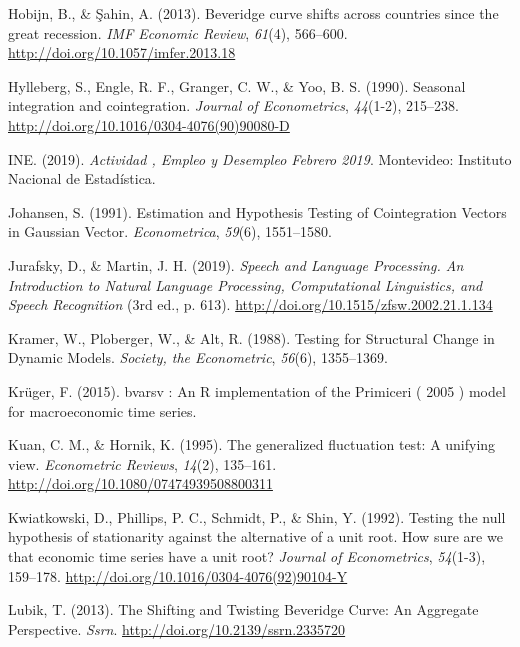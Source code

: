 \documentclass[12pt,oneside]{reedthesis}
\begin{document}
\leavevmode\hypertarget{ref-Hobijn2013}{}%
Hobijn, B., \& Şahin, A. (2013). Beveridge curve shifts across countries since the great recession. \emph{IMF Economic Review}, \emph{61}(4), 566--600. \url{http://doi.org/10.1057/imfer.2013.18}

\leavevmode\hypertarget{ref-hegy1990}{}%
Hylleberg, S., Engle, R. F., Granger, C. W., \& Yoo, B. S. (1990). Seasonal integration and cointegration. \emph{Journal of Econometrics}, \emph{44}(1-2), 215--238. \url{http://doi.org/10.1016/0304-4076(90)90080-D}

\leavevmode\hypertarget{ref-INE2019}{}%
INE. (2019). \emph{Actividad , Empleo y Desempleo Febrero 2019}. Montevideo: Instituto Nacional de Estadística.

\leavevmode\hypertarget{ref-Johansen1991}{}%
Johansen, S. (1991). Estimation and Hypothesis Testing of Cointegration Vectors in Gaussian Vector. \emph{Econometrica}, \emph{59}(6), 1551--1580.

\leavevmode\hypertarget{ref-Jurasky2019}{}%
Jurafsky, D., \& Martin, J. H. (2019). \emph{Speech and Language Processing. An Introduction to Natural Language Processing, Computational Linguistics, and Speech Recognition} (3rd ed., p. 613). \url{http://doi.org/10.1515/zfsw.2002.21.1.134}

\leavevmode\hypertarget{ref-Society1988}{}%
Kramer, W., Ploberger, W., \& Alt, R. (1988). Testing for Structural Change in Dynamic Models. \emph{Society, the Econometric}, \emph{56}(6), 1355--1369.

\leavevmode\hypertarget{ref-Kruger2015}{}%
Krüger, F. (2015). bvarsv : An R implementation of the Primiceri ( 2005 ) model for macroeconomic time series.

\leavevmode\hypertarget{ref-Kuan1995}{}%
Kuan, C. M., \& Hornik, K. (1995). The generalized fluctuation test: A unifying view. \emph{Econometric Reviews}, \emph{14}(2), 135--161. \url{http://doi.org/10.1080/07474939508800311}

\leavevmode\hypertarget{ref-KPSS1992}{}%
Kwiatkowski, D., Phillips, P. C., Schmidt, P., \& Shin, Y. (1992). Testing the null hypothesis of stationarity against the alternative of a unit root. How sure are we that economic time series have a unit root? \emph{Journal of Econometrics}, \emph{54}(1-3), 159--178. \url{http://doi.org/10.1016/0304-4076(92)90104-Y}

\leavevmode\hypertarget{ref-Lubik2013}{}%
Lubik, T. (2013). The Shifting and Twisting Beveridge Curve: An Aggregate Perspective. \emph{Ssrn}. \url{http://doi.org/10.2139/ssrn.2335720}
\end{document}
